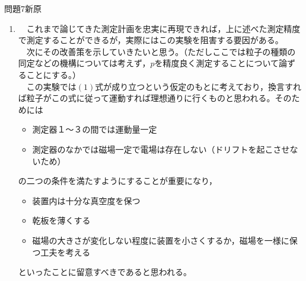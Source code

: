 \documentclass[fleqn]{jbook}
\def\ds{\displaystyle}
\begin{document}
\begin{answer}{問題7}{新原}
\begin{enumerate}
\begin{enumerate}
    \item 　$\ds \frac{\delta p}{p} = \frac{\sqrt{2} \sigma p}{0.15 BL^2}$\\
    
\end{enumerate}

  \item 　これまで論じてきた測定計画を忠実に再現できれば，上に述べた測定精度で測定することができるが，実際にはこの実験を阻害する要因がある。\\
　次にその改善策を示していきたいと思う。（ただしここでは粒子の種類の同定などの機構については考えず，$p$を精度良く測定することについて論ずることにする。）\\
　この実験では$(1)$式が成り立つという仮定のもとに考えており，換言すれば粒子がこの式に従って運動すれば理想通りに行くものと思われる。そのためには

\begin{itemize}
    \item 測定器１〜３の間では運動量一定
    \item 測定器のなかでは磁場一定で電場は存在しない（ドリフトを起こさせないため）
\end{itemize}
の二つの条件を満たすようにすることが重要になり，
\begin{itemize}
    \item 装置内は十分な真空度を保つ
    \item 乾板を薄くする
    \item 磁場の大きさが変化しない程度に装置を小さくするか，磁場を一様に保つ工夫を考える
\end{itemize}
といったことに留意すべきであると思われる。\\

\end{enumerate}


\end{answer}
\end{document}
